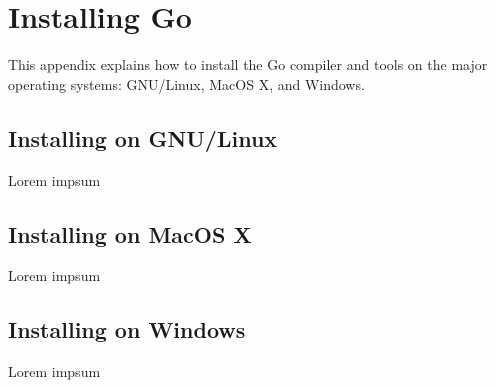 \chapter{Installing Go}

This appendix explains how to install the Go compiler and tools
on the major operating systems: GNU/Linux, MacOS X, and Windows.


\section{Installing on GNU/Linux}

Lorem impsum

\section{Installing on MacOS X}

Lorem impsum

\section{Installing on Windows}

Lorem impsum
